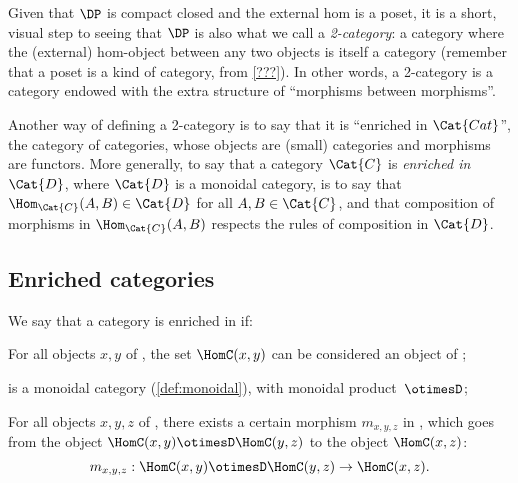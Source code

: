 Given that $\DP$ is compact closed and the external hom is a poset, it is a short, visual step to seeing that $\DP$ is also what we call a \emph{2-category}: a category where the (external) hom-object between any two objects is itself a category (remember that a poset is a kind of category, from \cref{???}). In other words, a 2-category is a category endowed with the extra structure of ``morphisms between morphisms''.

Another way of defining a 2-category is to say that it is ``enriched in $\Cat{Cat}$'', the category of categories, whose objects are (small) categories and morphisms are functors. More generally, to say that a category $\Cat{C}$ is \emph{enriched in $\Cat{D}$}, where $\Cat{D}$ is a monoidal category, is to say that $\Hom_\Cat{C}(A,B) \in \Cat{D}$ for all $A,B \in \Cat{C}$, and that composition of morphisms in $\Hom_\Cat{C}(A,B)$ respects the rules of composition in $\Cat{D}$.

\subsection{Enriched categories}

\begin{shaded}
\begin{definition}
We say that a category \CatC is enriched in \CatD if:
\begin{compactenum}
    \item For all objects $x, y$ of \CatC, the set $\HomC(x,y)$ can be considered an object of \CatD;
    \item \CatD is a monoidal category (\cref{def:monoidal}),
    with monoidal product~$\otimesD$;
    \item For all objects $x, y, z$ of \CatC, there exists
    a certain morphism $m_{x,y,z}$ in \CatD,
    which goes from the object $\HomC(x, y) \otimesD \HomC(y, z)$ to the object $\HomC(x, z)$:
    \begin{equation} \label{eq:enriched-condition}
        m_{x,y,z} :
            \HomC(x, y)
            \otimesD
            \HomC(y, z)
            \to
            \HomC(x, z) .
    \end{equation}
\end{compactenum}
\end{definition}
\end{shaded}

%

